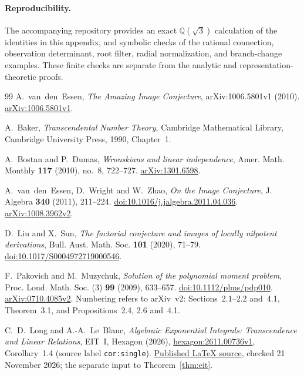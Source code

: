 \documentclass[11pt]{article}
\numberwithin{equation}{section}
\theoremstyle{definition}\newtheorem{definition}[theorem]{Definition}
\theoremstyle{remark}\newtheorem{remark}[theorem]{Remark}
\newcommand{\Q}{\mathbb Q}
\begin{document}
\paragraph{Reproducibility.}
The accompanying repository provides an exact $\Q(\sqrt3)$ calculation of the
identities in this appendix, and symbolic checks of the rational
connection, observation determinant, root filter, radial normalization,
and branch-change examples. These finite checks are separate from the
analytic and representation-theoretic proofs.
\small
\begin{thebibliography}{99}
A.~van~den~Essen, \emph{The Amazing Image Conjecture},
arXiv:1006.5801v1 (2010).
\href{https://arxiv.org/abs/1006.5801v1}{arXiv:1006.5801v1}.

A.~Baker, \emph{Transcendental Number Theory}, Cambridge Mathematical
Library, Cambridge University Press, 1990, Chapter~1.

A.~Bostan and P.~Dumas, \emph{Wronskians and linear independence},
Amer. Math. Monthly \textbf{117} (2010), no.~8, 722--727.
\href{https://arxiv.org/abs/1301.6598}{arXiv:1301.6598}.

A.~van~den~Essen, D.~Wright and W.~Zhao,
\emph{On the Image Conjecture}, J. Algebra \textbf{340} (2011),
211--224.
\href{https://doi.org/10.1016/j.jalgebra.2011.04.036}{doi:10.1016/j.jalgebra.2011.04.036}.
\href{https://arxiv.org/abs/1008.3962v2}{arXiv:1008.3962v2}.

D.~Liu and X.~Sun, \emph{The factorial conjecture and images of locally
nilpotent derivations}, Bull. Aust. Math. Soc. \textbf{101} (2020),
71--79.
\href{https://doi.org/10.1017/S0004972719000546}{doi:10.1017/S0004972719000546}.

F.~Pakovich and M.~Muzychuk, \emph{Solution of the polynomial moment
problem}, Proc. Lond. Math. Soc. (3) \textbf{99} (2009), 633--657.
\href{https://doi.org/10.1112/plms/pdp010}{doi:10.1112/plms/pdp010}.
\href{https://arxiv.org/abs/0710.4085v2}{arXiv:0710.4085v2}.
Numbering refers to arXiv~v2: Sections~2.1--2.2 and~4.1,
Theorem~3.1, and Propositions~2.4, 2.6 and~4.1.

C.~D.~Long and A.-A.~Le~Blanc, \emph{Algebraic Exponential Integrals:
Transcendence and Linear Relations}, EIT~I, Hexagon (2026),
\href{https://hexagonmath.org/2611.00736v1}{hexagon:2611.00736v1},
Corollary~1.4 (source label \texttt{cor:single}).
\href{https://hexagonmath.org/src/2611.00736v1}{Published LaTeX source},
checked 21 November 2026; the separate input to Theorem~\ref{thm:eit}.


\end{thebibliography}
\end{document}
